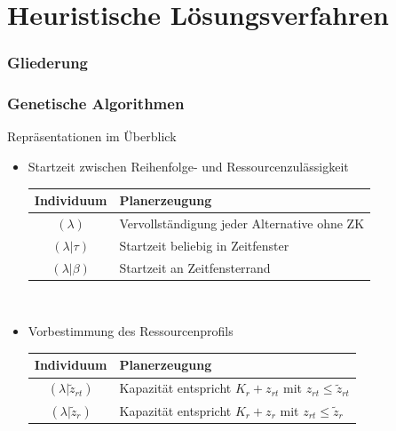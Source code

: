 
\section{Heuristische Lösungsverfahren}

\begin{frame}[noframenumbering]
\frametitle{Gliederung}
\end{frame}

\begin{frame}
\frametitle{Genetische Algorithmen}
Repräsentationen im Überblick
\begin{itemize}
	\item \small{Startzeit zwischen Reihenfolge- und Ressourcenzulässigkeit}\\[2mm]
	\begin{small}
	\begin{tabular}{cp{7.5cm}}
	\hline
	Individuum & Planerzeugung\\
	\hline
	$(\lambda)$ & Vervollständigung jeder Alternative ohne ZK\\	
	$(\lambda|\tau)$& Startzeit beliebig in Zeitfenster\\
	$(\lambda|\beta)$& Startzeit an Zeitfensterrand\\
	\end{tabular}
	\end{small}\\[4mm]
	
	\item \small{Vorbestimmung des Ressourcenprofils}\\[2mm]
	\begin{small}
		\begin{tabular}{cp{7.5cm}}
			\hline
			Individuum & Planerzeugung\\
			\hline
			$(\lambda|\tilde{z}_{rt})$ & Kapazität entspricht $K_r+z_{rt}$ mit $z_{rt} \leq \tilde{z}_{rt}$ \\
			$(\lambda|\tilde{z}_r)$ & Kapazität entspricht $K_r+z_r$ mit $z_{rt} \leq \tilde{z}_{r}$\\
		\end{tabular}
	\end{small}
\end{itemize}
\end{frame}


